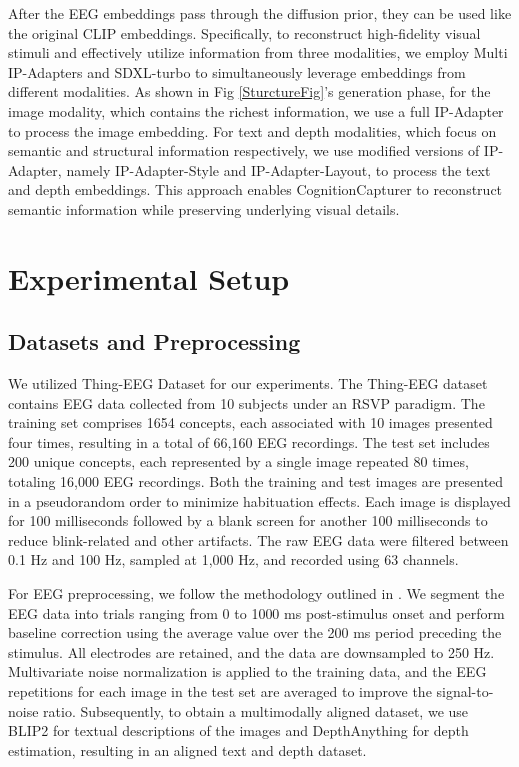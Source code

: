 \documentclass[letterpaper]{article} %
\begin{document}
After the EEG embeddings pass through the diffusion prior, they can be used like the original CLIP embeddings. Specifically, to reconstruct high-fidelity visual stimuli and effectively utilize information from three modalities, we employ Multi IP-Adapters \cite{ye2023ipadaptertextcompatibleimage} and SDXL-turbo \cite{sauer2023adversarialdiffusiondistillation} to simultaneously leverage embeddings from different modalities. As shown in Fig \ref{SturctureFig}'s generation phase, for the image modality, which contains the richest information, we use a full IP-Adapter to process the image embedding. For text and depth modalities, which focus on semantic and structural information respectively, we use modified versions of IP-Adapter, namely IP-Adapter-Style and IP-Adapter-Layout, to process the text and depth embeddings. This approach enables CognitionCapturer to reconstruct semantic information while preserving underlying visual details. 

\section{Experimental Setup}

\subsection{Datasets and Preprocessing}

We utilized Thing-EEG Dataset for our experiments. The Thing-EEG dataset \cite{gifford2022large} contains EEG data collected from 10 subjects under an RSVP paradigm. The training set comprises 1654 concepts, each associated with 10 images presented four times, resulting in a total of 66,160 EEG recordings. The test set includes 200 unique concepts, each represented by a single image repeated 80 times, totaling 16,000 EEG recordings. Both the training and test images are presented in a pseudorandom order to minimize habituation effects. Each image is displayed for 100 milliseconds followed by a blank screen for another 100 milliseconds to reduce blink-related and other artifacts. The raw EEG data were filtered between 0.1 Hz and 100 Hz, sampled at 1,000 Hz, and recorded using 63 channels. 

For EEG preprocessing, we follow the methodology outlined in \cite{song2024decoding, li2024visualdecodingreconstructioneeg}. We segment the EEG data into trials ranging from 0 to 1000 ms post-stimulus onset and perform baseline correction using the average value over the 200 ms period preceding the stimulus. All electrodes are retained, and the data are downsampled to 250 Hz. Multivariate noise normalization is applied to the training data, and the EEG repetitions for each image in the test set are averaged to improve the signal-to-noise ratio. Subsequently, to obtain a multimodally aligned dataset, we use BLIP2 \cite{li2023blip} for textual descriptions of the images and DepthAnything \cite{yang2024depth} for depth estimation, resulting in an aligned text and depth dataset.
\end{document}
